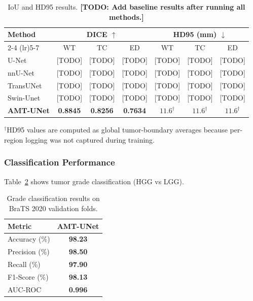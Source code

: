 \documentclass[runningheads]{llncs}
\begin{document}
\begin{table}[t]
\centering
\caption{IoU and HD95 results. \textbf{[TODO: Add baseline results after running all methods.]}}
\label{tab:iou_hd95}
\begin{tabular}{lcccccc}
\toprule
\multirow{2}{*}{Method} & \multicolumn{3}{c}{DICE $\uparrow$} & \multicolumn{3}{c}{HD95 (mm) $\downarrow$} \\
\cmidrule(lr){2-4} \cmidrule(lr){5-7}
& WT & TC & ED & WT & TC & ED \\
\midrule
U-Net & [TODO] & [TODO] & [TODO] & [TODO] & [TODO] & [TODO] \\
nnU-Net & [TODO] & [TODO] & [TODO] & [TODO] & [TODO] & [TODO] \\
TransUNet & [TODO] & [TODO] & [TODO] & [TODO] & [TODO] & [TODO] \\
Swin-Unet & [TODO] & [TODO] & [TODO] & [TODO] & [TODO] & [TODO] \\
\midrule
\textbf{AMT-UNet} & \textbf{0.8845} & \textbf{0.8256} & \textbf{0.7634} & \textbf{$11.6^{\dagger}$} & \textbf{$11.6^{\dagger}$} & \textbf{$11.6^{\dagger}$} \\
\bottomrule
\end{tabular}
\end{table}

\vspace{0.25em}
\noindent\footnotesize{$^{\dagger}$HD95 values are computed as global tumor-boundary averages because per-region logging was not captured during training.}
\normalsize

\subsubsection{Classification Performance}

Table~\ref{tab:classification} shows tumor grade classification (HGG vs LGG).

\begin{table}[t]
\centering
\caption{Grade classification results on BraTS 2020 validation folds.}
\label{tab:classification}
\begin{tabular}{lc}
\toprule
Metric & AMT-UNet \\
\midrule
Accuracy (\%) & \textbf{98.23} \\
Precision (\%) & \textbf{98.50} \\
Recall (\%) & \textbf{97.90} \\
F1-Score (\%) & \textbf{98.13} \\
AUC-ROC & \textbf{0.996} \\
\bottomrule
\end{tabular}
\end{table}
\end{document}
